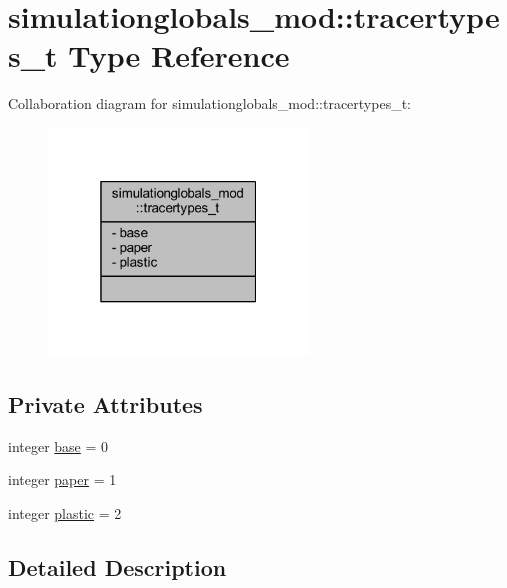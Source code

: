 \hypertarget{structsimulationglobals__mod_1_1tracertypes__t}{}\section{simulationglobals\+\_\+mod\+:\+:tracertypes\+\_\+t Type Reference}
\label{structsimulationglobals__mod_1_1tracertypes__t}


Collaboration diagram for simulationglobals\+\_\+mod\+:\+:tracertypes\+\_\+t\+:\nopagebreak
\begin{figure}[H]
\begin{center}
\leavevmode
\includegraphics[width=196pt]{structsimulationglobals__mod_1_1tracertypes__t__coll__graph}
\end{center}
\end{figure}
\subsection*{Private Attributes}
\begin{DoxyCompactItemize}
\item 
integer \mbox{\hyperlink{structsimulationglobals__mod_1_1tracertypes__t_a809513560a6ee14cba1bb397a5c73404}{base}} = 0
\item 
integer \mbox{\hyperlink{structsimulationglobals__mod_1_1tracertypes__t_a2f1cf14744f82ea11344cfc7ec1daa7d}{paper}} = 1
\item 
integer \mbox{\hyperlink{structsimulationglobals__mod_1_1tracertypes__t_a7996bd824036f8a4f4febde191b46afc}{plastic}} = 2
\end{DoxyCompactItemize}


\subsection{Detailed Description}


